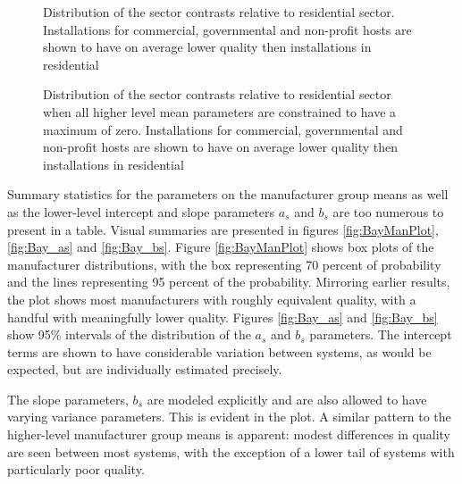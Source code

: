 \documentclass[a4paper]{article}
\begin{document}
\begin{figure} [!htb]
\begin{minipage}[t]{.48\textwidth}
\centering
 \caption{Distribution of the sector contrasts relative to residential sector. Installations for commercial, governmental and non-profit hosts are shown to have on average lower quality then installations in residential}
\end{minipage}\qquad
\begin{minipage}[t]{.48\textwidth}
\centering
 \caption{Distribution of the sector contrasts relative to residential sector when all higher level mean parameters are constrained to have a maximum of zero. Installations for commercial, governmental and non-profit hosts are shown to have on average lower quality then installations in residential}
\end{minipage}
\end{figure}

Summary statistics for the parameters on the manufacturer group means as well as the lower-level intercept and slope parameters $a_s$ and $b_s$ are too numerous to present in a table. Visual summaries are presented in figures \ref{fig:BayManPlot}, \ref{fig:Bay_as} and \ref{fig:Bay_bs}. Figure \ref{fig:BayManPlot} shows box plots of the manufacturer distributions, with the box representing 70 percent of probability and the lines representing 95 percent of the probability. Mirroring earlier results, the plot shows most manufacturers with roughly equivalent quality, with a handful with meaningfully lower quality. Figures \ref{fig:Bay_as} and \ref{fig:Bay_bs} show 95\% intervals of the distribution of the $a_s$ and $b_s$ parameters. The intercept terms are shown to have considerable variation between systems, as would be expected, but are individually estimated precisely.

The slope parameters, $b_s$ are modeled explicitly and are also allowed to have varying variance parameters. This is evident in the plot. A similar pattern to the higher-level manufacturer group means is apparent: modest differences in quality are seen between most systems, with the exception of a lower tail of systems with particularly poor quality.
\end{document}
